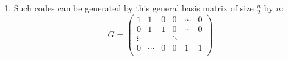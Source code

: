 \documentclass[a4paper,9pt]{extarticle}
\begin{document}
\begin{enumerate}
\begin{enumerate}
    \end{enumerate}
  \item Such codes can be generated by this general basis matrix of size $\frac{n}{2}$ by $n$:
    \[ 
      G=
      \begin{pmatrix}
        1 & 1 & 0 & 0 & \cdots & 0 \\
        0 & 1 & 1 & 0 & \cdots & 0 \\
        \vdots &   &   & \ddots \\
        0 & \cdots & 0 & 0 & 1 & 1 \\
      \end{pmatrix}
    \]
\end{enumerate}
\end{document}
